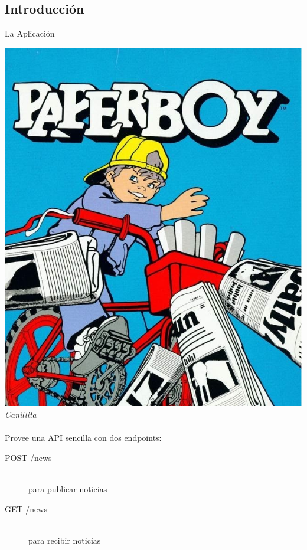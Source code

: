 \documentclass[utf8,hyperref={colorlinks=true}]{beamer}
\begin{document}
\subsection{Introducci\'on}
\begin{frame}{La Aplicaci\'on}
\begin{multicols}{2}
\includegraphics[height=.8\textheight]{img/paperboy.jpg} \\
\columnbreak
	\alert{\textit{{\huge Canillita}}}
	\ \\
	\ \\
	Provee una API sencilla con dos endpoints:
	\ \\
		\begin{description}
			\item[POST /news]\ \\ para publicar noticias
			\item[GET /news]\ \\ para recibir noticias
		\end{description}
\end{multicols}
\end{frame}
\end{document}
